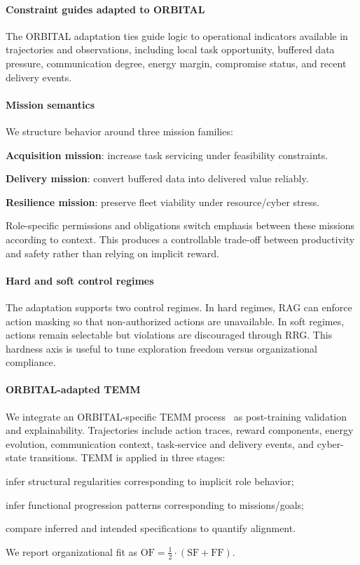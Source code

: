 \documentclass[sigconf]{aamas}
\begin{document}
\paragraph{Constraint guides adapted to ORBITAL}

The ORBITAL adaptation ties guide logic to operational indicators available in trajectories and observations, including local task opportunity, buffered data pressure, communication degree, energy margin, compromise status, and recent delivery events.

\paragraph{Mission semantics}
We structure behavior around three mission families:
\begin{enumerate*}[label={\roman*) },itemjoin={; \quad}]
    \item \textbf{Acquisition mission}: increase task servicing under feasibility constraints.
    \item \textbf{Delivery mission}: convert buffered data into delivered value reliably.
    \item \textbf{Resilience mission}: preserve fleet viability under resource/cyber stress.
\end{enumerate*}
Role-specific permissions and obligations switch emphasis between these missions according to context. This produces a controllable trade-off between productivity and safety rather than relying on implicit reward.

\paragraph{Hard and soft control regimes}
The adaptation supports two control regimes. In hard regimes, RAG can enforce action masking so that non-authorized actions are unavailable. In soft regimes, actions remain selectable but violations are discouraged through RRG. This hardness axis is useful to tune exploration freedom versus organizational compliance.

\paragraph{ORBITAL-adapted TEMM}
We integrate an ORBITAL-specific TEMM process~\cite{soule2024moise_marl} as post-training validation and explainability. Trajectories include action traces, reward components, energy evolution, communication context, task-service and delivery events, and cyber-state transitions. TEMM is applied in three stages:
\begin{enumerate*}[label={\roman*) },itemjoin={; \quad}]
    \item infer structural regularities corresponding to implicit role behavior;
    \item infer functional progression patterns corresponding to missions/goals;
    \item compare inferred and intended specifications to quantify alignment.
\end{enumerate*}
We report organizational fit as $\mathrm{OF}=\frac{1}{2} \cdot (\mathrm{SF} + \mathrm{FF})$.
\end{document}
